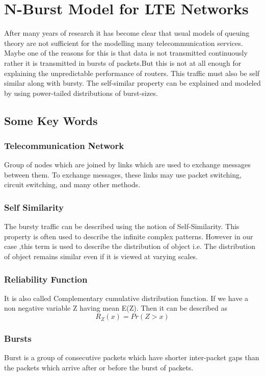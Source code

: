 \chapter{N-Burst Model for LTE Networks}

After many years of research it has become clear that usual models of queuing theory are not sufficient for the modelling many telecommunication services. Maybe one of the reasons for this is that data is not transmitted continuously rather it is transmitted in bursts of packets.But this is not at all enough for explaining the unpredictable performance of routers. This traffic must also be self similar along with bursty. The  self-similar property can be explained and modeled by using power-tailed distributions of burst-sizes.

\section{Some Key Words}
\subsection{Telecommunication Network}
Group of nodes which are joined by links which are used to exchange messages between them. To exchange messages, these links may use packet switching, circuit switching, and many other methods.

\subsection{Self Similarity}
The bursty traffic can be described using the notion of Self-Similarity. This property is often used to describe the infinite complex patterns. However in our case ,this term is used to describe the distribution of object i.e. The distribution of object remains similar even if it is viewed at varying scales.

\subsection{Reliability Function}
It is also called Complementary cumulative distribution function. If we have a non negative variable Z  having mean E(Z). Then it can be described as
\begin{equation}
R_{Z}(x) = Pr(Z > x)
\end{equation}

\subsection{Bursts}
Burst is a group of consecutive packets which have shorter inter-packet gaps than the packets which arrive after or before the burst of packets.

